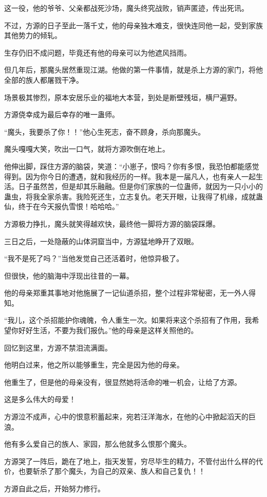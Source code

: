 \begin{this_body}
这一役，他的爷爷、父亲都战死沙场，魔头终究战败，销声匿迹，传出死讯。

不过，方源的日子至此一落千丈，他的母亲独木难支，很快连同他一起，受到家族其他势力的倾轧。

生存仍旧不成问题，毕竟还有他的母亲可以为他遮风挡雨。

但几年后，那魔头居然重现江湖。他做的第一件事情，就是杀上方源的家门，将他全部的族人都屠戮干净。

场景极其惨烈，原本安居乐业的福地大本营，到处是断壁残垣，横尸遍野。

方源侥幸成为最后幸存的唯一蛊师。

“魔头，我要杀了你！！”他心生死志，奋不顾身，杀向那魔头。

魔头嘎嘎大笑，吹出一口气，就将方源吹倒在地上。

他伸出脚，踩住方源的脑袋，笑道：“小崽子，恨吗？你有多恨，我恐怕都能感觉得到。因为你今日的遭遇，就和我经历的一样。我本是一届凡人，也有亲人一起生活。日子虽然苦，但是却其乐融融。但是你们家族的一位蛊师，就因为一只小小的蛊虫，将我全家杀害。我险死还生，立志复仇。老天开眼，让我得了机缘，成就蛊仙，终于在今天报仇雪恨！哈哈哈。”

方源极力挣扎，魔头就笑得越欢快，最终他一脚将方源的脑袋踩爆。

三日之后，一处隐蔽的山体洞窟当中，方源猛地睁开了双眼。

“我不是死了吗？”当他发觉自己还活着时，他惊异极了。

但很快，他的脑海中浮现出往昔的一幕。

他的母亲郑重其事地对他施展了一记仙道杀招，整个过程非常秘密，无一外人得知。

“我儿，这个杀招能护你魂魄，令人重生一次。如果将来这个杀招有了作用，我希望你好好生活，不要为我们报仇。”他的母亲是这样关照他的。

回忆到这里，方源不禁泪流满面。

他明白过来，他之所以能够重生，完全是因为他的母亲。

他重生了，但是他的母亲没有，很显然她将活命的唯一机会，让给了方源。

这是多么伟大的母爱！

方源泣不成声，心中的恨意积蓄起来，宛若汪洋海水，在他的心中掀起滔天的巨浪。

他有多么爱自己的族人、家园，那么他就多么恨那个魔头。

方源哭了一阵后，跪在了地上，指天发誓，穷尽毕生的精力，不管付出什么样的代价，也要斩杀了那个魔头，为自己的双亲、族人和自己复仇！！

方源自此之后，开始努力修行。


\end{this_body}
